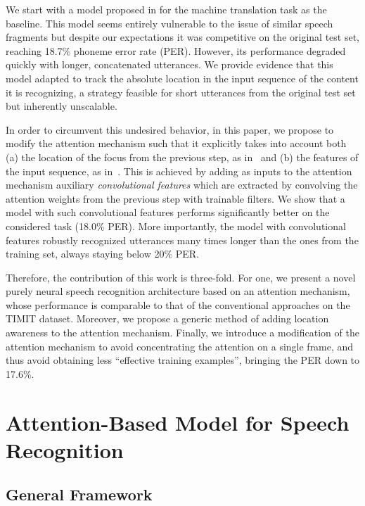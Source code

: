 \documentclass{article}
\begin{document}
We start with a model proposed in
\cite{bahdanau_neural_2014} for the machine translation task
as the baseline. This model seems entirely vulnerable to
the issue of similar speech fragments 
but despite our
expectations it was competitive on the original test set, reaching 18.7\% phoneme
error rate (PER). However, its performance
degraded quickly with longer, concatenated utterances. We
provide evidence that this model adapted to track the absolute
location in the input sequence of the content it is
recognizing, a strategy feasible for short utterances from the
original test set but inherently unscalable.

In order to circumvent this undesired behavior, in this
paper, we propose to modify the attention mechanism such
that it explicitly takes into account both (a) the location of the
focus from the previous step, as in~\cite{graves_2014} and (b)
the features of the input sequence, as in~\cite{bahdanau_neural_2014}. 
This is achieved by adding as inputs to the attention mechanism
auxiliary {\it convolutional features} which are extracted 
by convolving the attention
weights from the previous step with trainable filters.  We show that a model
with such convolutional features performs significantly
better on the considered task (18.0\% PER). More
importantly, the model with convolutional features robustly
recognized utterances many times longer than the ones
from the training set, always staying below 20\% PER.



Therefore, the contribution of this work is three-fold. For one, we present a
novel purely neural speech recognition architecture based on an attention
mechanism, whose performance is comparable to that of the conventional
approaches on the TIMIT dataset.  Moreover, we propose a generic method of
adding location awareness to the attention mechanism. Finally, we introduce a
modification of the attention mechanism to avoid concentrating the attention on
a single frame, and thus avoid obtaining less ``effective training examples'',
bringing the PER down to 17.6\%.

\section{Attention-Based Model for Speech Recognition}

\subsection{General Framework}
\label{subsec:framework}
\end{document}

